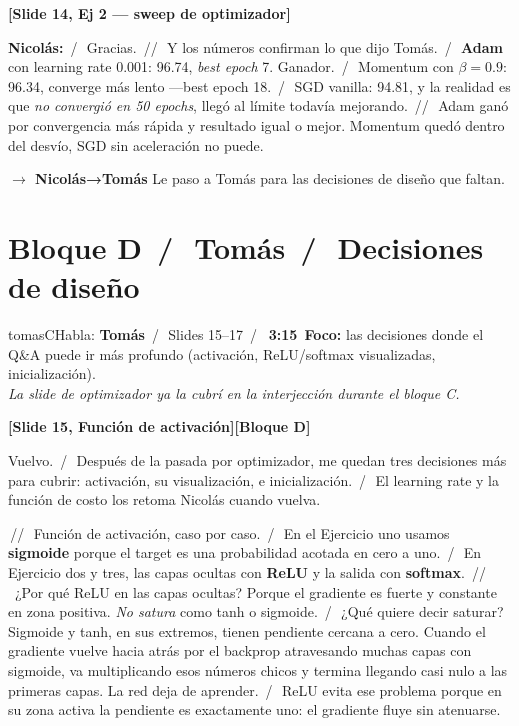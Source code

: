 \documentclass[11pt,a4paper]{article}
\newcommand{\slidenum}[1]{\textcolor{accent}{\textbf{[Slide #1]}}}
\newcommand{\timing}[1]{\textcolor{muted}{\textbf{\,#1\,}}}
\newcommand{\bloque}[1]{\textcolor{muted}{\small\textbf{[Bloque #1]}}}
\newcommand{\pausa}{\textcolor{muted}{\,/\,}}
\newcommand{\Pausa}{\textcolor{muted}{\,/\!/\,}}
\newcommand{\paso}[1]{\textcolor{accent}{\textbf{$\to$ #1}}}
\begin{document}
\medskip
\slidenum{14, Ej 2 — sweep de optimizador}

\textcolor{nicoC}{\textbf{Nicolás:}} \pausa\ Gracias. \Pausa\ Y los números confirman lo que dijo Tomás. \pausa\ \textbf{Adam} con learning rate 0.001: 96.74, \emph{best epoch} 7. Ganador. \pausa\ Momentum con $\beta = 0.9$: 96.34, converge más lento ---best epoch 18. \pausa\ SGD vanilla: 94.81, y la realidad es que \emph{no convergió en 50 epochs}, llegó al límite todavía mejorando. \Pausa\ Adam ganó por convergencia más rápida y resultado igual o mejor. Momentum quedó dentro del desvío, SGD sin aceleración no puede.

\paso{Nicolás→Tomás} \quad Le paso a Tomás para las decisiones de diseño que faltan.

\section{Bloque D \pausa\ \textcolor{tomasC}{Tomás} \pausa\ Decisiones de diseño}\label{sec:bloqueD}

\begin{personabox}{tomasC}{Habla: \textcolor{tomasC}{\textbf{Tomás}} \pausa\ Slides 15--17 \pausa\ \timing{3:15}}
\textbf{Foco:} las decisiones donde el Q\&A puede ir más profundo (activación, ReLU/softmax visualizadas, inicialización). \\
\emph{La slide de optimizador ya la cubrí en la interjección durante el bloque C.}
\end{personabox}

\slidenum{15, Función de activación}\quad \bloque{D}

Vuelvo. \pausa\ Después de la pasada por optimizador, me quedan tres decisiones más para cubrir: activación, su visualización, e inicialización. \pausa\ El learning rate y la función de costo los retoma Nicolás cuando vuelva.

\Pausa\ Función de activación, caso por caso. \pausa\ En el Ejercicio uno usamos \textbf{sigmoide} porque el target es una probabilidad acotada en cero a uno. \pausa\ En Ejercicio dos y tres, las capas ocultas con \textbf{ReLU} y la salida con \textbf{softmax}. \Pausa\ ¿Por qué ReLU en las capas ocultas? Porque el gradiente es fuerte y constante en zona positiva. \emph{No satura} como tanh o sigmoide. \pausa\ ¿Qué quiere decir saturar? Sigmoide y tanh, en sus extremos, tienen pendiente cercana a cero. Cuando el gradiente vuelve hacia atrás por el backprop atravesando muchas capas con sigmoide, va multiplicando esos números chicos y termina llegando casi nulo a las primeras capas. La red deja de aprender. \pausa\ ReLU evita ese problema porque en su zona activa la pendiente es exactamente uno: el gradiente fluye sin atenuarse.
\end{document}
